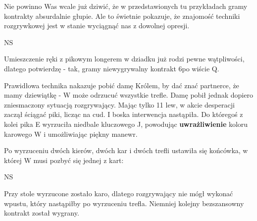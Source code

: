 \documentclass[12pt, a4paper]{article}
\newcounter{board}
\newcommand\nextboard{\stepcounter{board}\theboard}
\begin{document}
Nie powinno Was wcale już dziwić, że w przedstawionych tu przykładach gramy kontrakty absurdalnie głupie. Ale to świetnie pokazuje, że znajomość techniki rozgrywkowej jest w stanie wyciągnąć nas z dowolnej opresji.

\handdiagramv[\nextboard]{\vhand{KQJ98653}{K7}{T4}{T}}
				{}
				{}
				{}{NS}

Umieszczenie ręki z pikowym longerem w dziadku już rodzi pewne wątpliwości, dlatego potwierdzę - tak, gramy niewygrywalny kontrakt 6\nt po wiście \xclubs Q.

Prawidłowa technika nakazuje pobić damę Królem, by dać znać partnerce, że mamy dziewiątkę - W może odrzucuć wszystkie trefle. Damę pobił jednak dopiero zniesmaczony sytuacją rozgrywający.
Mając tylko 11 lew, w akcie desperacji zaczął ściągać piki, licząc na cud. I boska interwencja nastąpiła. Do któregoś z kolei pika E wyrzuciła niedbale kluczowego \xdiams J, 
powodując \textbf{uwrażliwienie} koloru karowego W i umożliwiając piękny manewr.

Po wyrzuceniu dwóch kierów, dwóch kar i dwóch trefli ustawiła się końcówka, w której W musi pozbyć się jednej z kart:

				{}
				{}
				{}{NS}
				
Przy stole wyrzucone zostało karo, dlatego rozgrywający nie mógł wykonać wpustu, który nastąpiłby po wyrzuceniu trefla. Niemniej kolejny bezszansowny kontrakt został wygrany.
\end{document}
